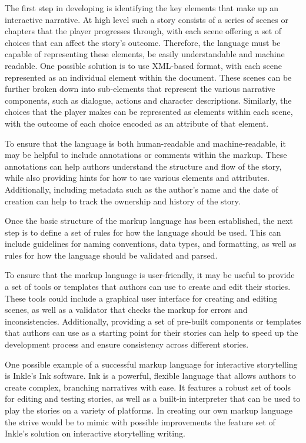 The first step in developing is identifying the key elements that make up an interactive narrative. At high level such a story consists of a series of scenes or chapters that the player progresses through, with each scene offering a set of choices that can affect the story’s outcome. Therefore, the language must be capable of representing these elements, be easily understandable and machine readable.
One possible solution is to use XML-based format, with each scene represented as an individual element within the document. These scenes can be further broken down into sub-elements that represent the various narrative components, such as dialogue, actions and character descriptions. Similarly, the choices that the player makes can be represented as elements within each scene, with the outcome of each choice encoded as an attribute of that element.

To ensure that the language is both human-readable and machine-readable, it may be helpful to include annotations or comments within the markup. These annotations can help authors understand the structure and flow of the story, while also providing hints for how to use various elements and attributes. Additionally, including metadata such as the author's name and the date of creation can help to track the ownership and history of the story.

Once the basic structure of the markup language has been established, the next step is to define a set of rules for how the language should be used. This can include guidelines for naming conventions, data types, and formatting, as well as rules for how the language should be validated and parsed.

To ensure that the markup language is user-friendly, it may be useful to provide a set of tools or templates that authors can use to create and edit their stories. These tools could include a graphical user interface for creating and editing scenes, as well as a validator that checks the markup for errors and inconsistencies. Additionally, providing a set of pre-built components or templates that authors can use as a starting point for their stories can help to speed up the development process and ensure consistency across different stories.

One possible example of a successful markup language for interactive storytelling is Inkle's Ink software. Ink is a powerful, flexible language that allows authors to create complex, branching narratives with ease. It features a robust set of tools for editing and testing stories, as well as a built-in interpreter that can be used to play the stories on a variety of platforms. In creating our own markup language the strive would be to mimic with possible improvements the feature set of Inkle’s solution on interactive storytelling writing.

